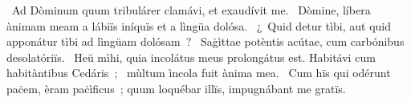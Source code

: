 \psalmChapterWithInscription{}
{ }
{%
~Ad Dòminum quum tribulárer clamávi, et exaudívit me. 
~Dòmine, líbera ànimam meam a lábiïs iníquïs et a lìngüa dolósa. 
~¿~Quid detur tìbi, aut quid apponátur tìbi ad lìngüam dolósam~? 
~Saġìttae potèntis acútae, cum carbónibus desolatóriïs. 
~Heŭ mìhi, quia incolátus meus prolongátus est. Habitávi cum habitàntibus Cedáris~; 
~mùltum ìncola fuit ànima mea. 
~Cum hïs qui odérunt paċem, èram paċìficus~; quum loquébar illïs, impugnábant me gratïs. 
}
